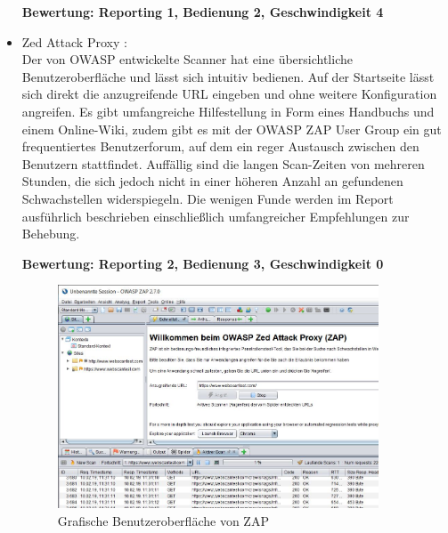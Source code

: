 \documentclass[12pt,oneside,a4paper,parskip]{scrbook}
\begin{document}
\begin{itemize}
            \textbf{Bewertung: Reporting 1, Bedienung 2, Geschwindigkeit 4}

          \item Zed Attack Proxy \cite{ZAP}:\\
            Der von OWASP entwickelte Scanner hat eine übersichtliche Benutzeroberfläche und lässt sich intuitiv bedienen. Auf der Startseite lässt sich direkt die anzugreifende URL eingeben und ohne weitere Konfiguration angreifen. Es gibt umfangreiche Hilfestellung in Form eines Handbuchs und einem Online-Wiki, zudem gibt es mit der OWASP ZAP User Group ein gut frequentiertes Benutzerforum, auf dem ein reger Austausch zwischen den Benutzern stattfindet.
            Auffällig sind die langen Scan-Zeiten von mehreren Stunden, die sich jedoch nicht in einer höheren Anzahl an gefundenen Schwachstellen widerspiegeln. Die wenigen Funde werden im Report ausführlich beschrieben einschließlich umfangreicher Empfehlungen zur Behebung.

            \textbf{Bewertung: Reporting 2, Bedienung 3, Geschwindigkeit 0}
          \begin{figure}[H]
            \centering
            \includegraphics[width=0.9\textwidth]{Images/ZAP}
            \caption[Grafische Benutzeroberfläche von ZAP]{Grafische Benutzeroberfläche von ZAP}
          \end{figure}
        \end{itemize}
\end{document}
